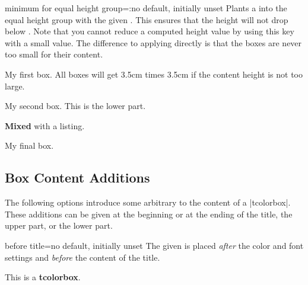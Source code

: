 \clearpage
\begin{docTcbKey}{minimum for equal height group}{=:}{no default, initially unset}
  Plants a  into the equal height group with
  the given . This ensures that the height will not drop below
  . Note that you cannot reduce a computed height value
  by using this key with a small value.
  The difference to applying  directly is that the boxes
  are never too small for their content.

\begin{dispExample}

\begin{tcolorbox}
  My first box. All boxes will get 3.5cm times 3.5cm
  if the content height is not too large.
\end{tcolorbox}%
\begin{tcolorbox}
  My second box.
  \tcblower
  This is the lower part.
\end{tcolorbox}%
\begin{tcblisting}{}
\textbf{Mixed}
with a listing.
\end{tcblisting}
\begin{tcolorbox}[title={Fourth box}]
  My final box.
\end{tcolorbox}%
\end{dispExample}
\end{docTcbKey}


\clearpage
\subsection{Box Content Additions}\label{subsec:contentadditions}
The following options introduce some arbitrary  to the content
of a |tcolorbox|. These additions can be given at the beginning or at the ending
of the title, the upper part, or the lower part.

\begin{docTcbKey}{before title}{=}{no default, initially unset}
  The given  is placed \emph{after} the color and font settings
  and \emph{before} the content of the title.
\begin{dispExample}

\begin{tcolorbox}[title=My title]
This is a \textbf{tcolorbox}.
\end{tcolorbox}
\end{dispExample}
\end{docTcbKey}


